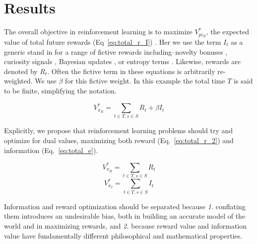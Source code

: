 \documentclass[9pt,twocolumn,twoside]{pnas-new}
\begin{document}


\section*{Results}
The overall objective in reinforcement learning is to maximize $V^{*}_{pi_R}$, the expected value of total future rewards (Eq~\ref{eq:total_r_I}) \cite{Sutton2018}. Her we use the term $I_t$ as a generic stand in for a range of fictive rewards including--novelty bonuses \cite{Kakade2002}, curiosity signals \cite{Pathak2017}, Bayesian updates \cite{Radulescu2019}, or entropy terms \cite{Haarnoja2015,Haarnoja2017}. Likewise, rewards are denoted by $R_t$. Often the fictive term in these equations is arbitrarily re-weighted. We use $\beta$ for this fictive weight. In this example the total time $T$ is said to be finite, simplifying the notation.

\begin{equation}
    V^{*}_{\pi_R} = \sum_{t \in T, s \in S} R_t + \beta I_t
    \label{eq:total_r_I}
\end{equation}

Explicitly, we propose that reinforcement learning problems should try and optimize for dual values, maximizing both reward (Eq.~\ref{eq:total_r_2}) and information (Eq.~\ref{eq:total_e}). 

\begin{multicols}{2}
  \begin{equation}
    V^{*}_{\pi_R} = \sum_{t \in T, s \in S} R_t
    \label{eq:total_r_2}
  \end{equation} \break
  \begin{equation}
    V^{*}_{\pi_I} = \sum_{t \in T, s \in S} I_t
    \label{eq:total_e}
  \end{equation}
\end{multicols}

Information and reward optimization should be separated because \textit{1.} conflating them introduces an undesirable bias, both in building an accurate model of the world and in maximizing rewards, and \textit{2.} because reward value and information value have fundamentally different philosophical and mathematical properties. 
\end{document}
